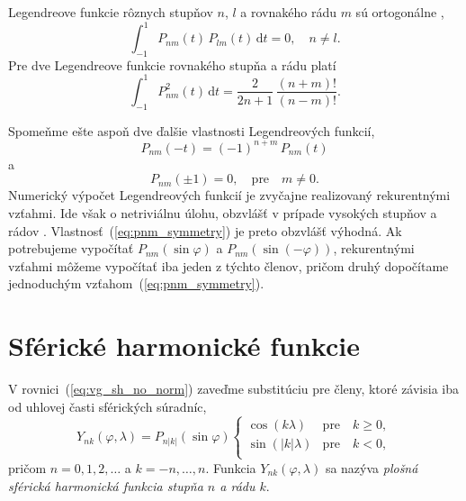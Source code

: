 \documentclass[a4paper, 12pt]{book}
\newcommand{\diff}{\mathrm d}
\begin{document}
Legendreove funkcie rôznych stupňov $n$, $l$ a rovnakého rádu $m$ sú 
ortogonálne \citep{Freeden2009},
%
\begin{equation}
\label{eq:pnm_orthogonality}
\int_{-1}^{1} P_{nm}(t) \, P_{lm}(t) \, \diff t = 0{,} \quad n \neq l{.}
\end{equation}
%
Pre dve Legendreove funkcie rovnakého stupňa a rádu platí
\begin{equation}
\label{eq:pnm_times_pnm}
\int_{-1}^{1} P^2_{nm}(t) \, \diff t = \frac{2}{2n + 1} \, \frac{(n + m)!}{(n 
- m)!}{.}
\end{equation}

Spomeňme ešte aspoň dve ďalšie vlastnosti Legendreových funkcií,
%
\begin{equation}
\label{eq:pnm_symmetry}
P_{nm}(-t) = (-1)^{n + m} \, P_{nm}(t)
\end{equation}
%
a
%
\begin{equation}
P_{nm}(\pm1) = 0{,} \quad \text{pre} \quad m \neq 0{.}
\end{equation}
%
Numerický výpočet Legendreových funkcií je zvyčajne realizovaný rekurentnými 
vzťahmi.  Ide však o netriviálnu úlohu, obzvlášť v prípade vysokých stupňov 
a rádov \citep{Holmes2002a,Fukushima2012a}.  Vlastnosť~(\ref{eq:pnm_symmetry}) 
je preto obzvlášť výhodná.  Ak potrebujeme vypočítať $P_{nm}(\sin\varphi)$ 
a $P_{nm}(\sin(-\varphi))$, rekurentnými vzťahmi môžeme vypočítať iba jeden 
z týchto členov, pričom druhý dopočítame jednoduchým 
vzťahom~(\ref{eq:pnm_symmetry}).




\section{Sférické harmonické funkcie}
\label{sec:spherical_harmonics}

V rovnici~(\ref{eq:vg_sh_no_norm}) zaveďme substitúciu pre členy, ktoré závisia 
iba od uhlovej časti sférických súradníc,
%
\begin{equation}
\label{eq:ynk_no_norm}
Y_{nk}(\varphi, \lambda) = P_{n|k|}(\sin\varphi)
%
\begin{cases}
\cos(k\lambda)    &\text{pre} \quad k \geq 0{,}\\
\sin(|k|\lambda)  &\text{pre} \quad k < 0{,}\\
\end{cases}
\end{equation}
%
pričom $n = 0, 1, 2, \dots$ a $k = -n, \dots, n$.  Funkcia $Y_{nk}(\varphi, 
\lambda)$ sa nazýva \emph{plošná sférická harmonická funkcia stupňa $n$ a rádu 
$k$}.
\end{document}
